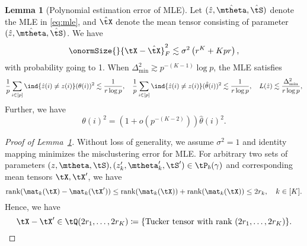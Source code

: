 \documentclass[lettersize,onecolumn,journal]{IEEEtran}
\theoremstyle{definition}
\newtheorem{lem}{Lemma}
\theoremstyle{definition}
\newcommand{\of}[1]{\left(#1\right)}
\begin{document}
{
  

   
\begin{lem}[Polynomial estimation error of MLE]\label{lem:poly_mle_degree}  Let $(\hat z, \hat \mtheta, \hat \tS)$ denote the MLE in \eqref{eq:mle}, and $\hat \tX$ denote the mean tensor consisting of parameter $(\hat z, \hat \mtheta, \hat \tS)$. We have 
\begin{equation}
    \onormSize{}{\tX - \hat \tX}_F^2 \lesssim \sigma^2 \of{ r^{K} + K p r},
\end{equation}
with probability going to 1. 
When $\Delta_{\min}^2 \gtrsim p^{-(K-1)} \log p$, the MLE satisfies
\begin{equation}
    \frac{1}{p} \sum_{i \in [p]} \ind\{ \hat z(i) \neq z(i) \} (\theta(i))^2 \lesssim \frac{1}{r \log p}, \quad \frac{1}{p} \sum_{i \in [p]} \ind\{ \hat z(i) \neq z(i) \} (\hat \theta(i))^2 \lesssim \frac{1}{r \log p} ,\quad   L(\hat z) \lesssim \frac{\Delta_{\min}^2}{r \log p},
\end{equation}
Further, we have 
\begin{equation}
     \theta(i)^2 = (1 + o(p^{-(K-2)})) \hat \theta(i)^2.
 \end{equation}
\end{lem}

\begin{proof}[Proof of Lemma~\ref{lem:poly_mle_degree}] Without loss of generality, we assume $\sigma^2 = 1$ and identity mapping minimizes the misclustering error for MLE.
For arbitrary two sets of parameters $(z, \mtheta, \tS), (z_k', \mtheta_k', \tS') \in \tP_b(\gamma)$ and corresponding mean tensors $\tX, \tX'$, we have 
\begin{equation}
    \text{rank}(\mat_k(\tX) - \mat_k(\tX')) \leq \text{rank}(\mat_k(\tX)) + \text{rank}(\mat_k(\tX)) \leq 2 r_k, \quad k \in [K].
\end{equation}
Hence, we have
\begin{equation}\label{eq:dtbm_tucker}
    \tX - \tX' \in \tQ(2r_1, \ldots, 2 r_K) \coloneqq \{ \text{Tucker tensor with rank }(2r_1, \ldots, 2 r_K) \}.
\end{equation}


\end{proof}}
\end{document}
